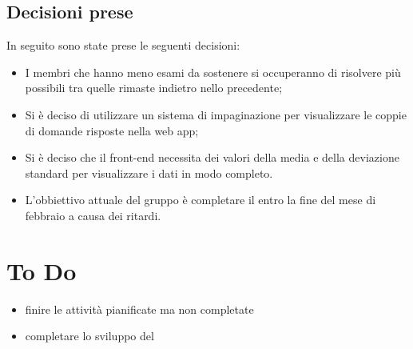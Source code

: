 \documentclass[a4paper, 12pt]{article}
\begin{document}
\subsection{Decisioni prese}
In seguito sono state prese le seguenti decisioni:
\begin{itemize}
    \item I membri che hanno meno esami da sostenere si occuperanno di risolvere più  possibili tra quelle rimaste indietro nello  precedente;
    \item Si è deciso di utilizzare un sistema di impaginazione per visualizzare le coppie di domande risposte nella web app;
    \item Si è deciso che il front-end necessita dei valori della media e della deviazione standard per visualizzare i dati in modo completo.
    \item L'obbiettivo attuale del gruppo è completare il  entro la fine del mese di febbraio a causa dei ritardi.
\end{itemize}

\section{To Do}
\begin{itemize}
    \item finire le attività pianificate ma non completate
    \item completare lo sviluppo del 
\end{itemize}
\end{document}
